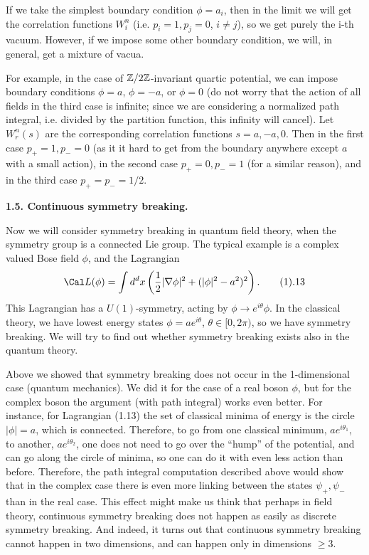 If we take the simplest boundary condition $\phi=a_i$, then 
in the limit we will get the correlation functions $W_i^n$
(i.e. $p_i=1,p_j=0$, $i\ne j$), so we get purely the i-th vacuum. 
However, if we impose some other boundary condition, we will, in general, 
get a mixture of vacua. 

For example, in the case of $\Bbb Z/2\Bbb Z$-invariant quartic potential, 
we can impose boundary conditions $\phi=a$, $\phi=-a$, or $\phi=0$
(do not worry that the action of all fields in the third case is infinite;
since we are considering a normalized path integral, i.e. divided 
by the partition function, this infinity will cancel).
Let $W_r^n(s)$ are the corresponding correlation functions 
$s=a,-a,0$. Then in the first case $p_+=1,p_-=0$
(as it it hard to get from the boundary anywhere except $a$ with a small action), 
in the second case $p_+=0,p_-=1$ (for a similar reason), and in the third case 
$p_+=p_-=1/2$.

{\bf 1.5. Continuous symmetry breaking.}

Now we will consider symmetry breaking in quantum field theory, when 
the symmetry group is a connected Lie group. 
The typical example is
 a complex valued Bose field $\phi$, and the Lagrangian
$$
\Cal L(\phi)=\int d^dx\left(\frac{1}{2}|\nabla \phi|^2+
(|\phi|^2-a^2)^2\right).\tag 1.13
$$
This Lagrangian has a $U(1)$-symmetry, acting by $\phi\to e^{i\theta}\phi$. 
In the classical theory, we have lowest energy states $\phi=ae^{i\theta}$, 
$\theta\in [0,2\pi)$, so we have symmetry breaking. 
We will try to find out whether symmetry breaking 
exists also in the quantum theory. 

Above we showed that symmetry breaking does not occur in the 1-dimensional 
case (quantum mechanics). We did it for the case of a real boson $\phi$, 
but for the complex boson the argument (with path integral) works even better. 
For instance, for Lagrangian (1.13) the set of classical minima of energy is 
the circle $|\phi|=a$, which is connected. Therefore, 
to go from one classical minimum, $ae^{i\theta_1}$, 
to another, $ae^{i\theta_2}$, one does not need to go over the ``hump'' 
of the potential, and can go along the circle of minima, so one can do
it with even less action than before. Therefore, the path integral 
computation described above would show that in the complex case
there is even more linking between the states $\psi_+,\psi_-$
than in the real case. This effect might make us think that 
perhaps in field theory, 
continuous symmetry breaking does not happen as easily 
as discrete symmetry breaking. And indeed, it turns out 
that continuous symmetry breaking cannot happen in two dimensions, 
and can happen only in dimensions $\ge 3$. 

